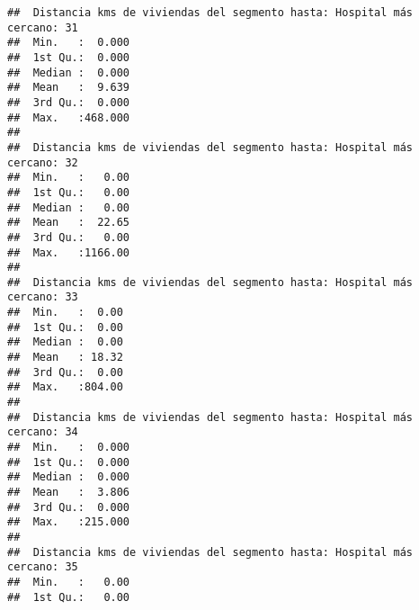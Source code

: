 \documentclass[11pt,]{article}
\begin{document}
\begin{verbatim}
##  Distancia kms de viviendas del segmento hasta: Hospital más cercano: 31
##  Min.   :  0.000                                                        
##  1st Qu.:  0.000                                                        
##  Median :  0.000                                                        
##  Mean   :  9.639                                                        
##  3rd Qu.:  0.000                                                        
##  Max.   :468.000                                                        
##                                                                         
##  Distancia kms de viviendas del segmento hasta: Hospital más cercano: 32
##  Min.   :   0.00                                                        
##  1st Qu.:   0.00                                                        
##  Median :   0.00                                                        
##  Mean   :  22.65                                                        
##  3rd Qu.:   0.00                                                        
##  Max.   :1166.00                                                        
##                                                                         
##  Distancia kms de viviendas del segmento hasta: Hospital más cercano: 33
##  Min.   :  0.00                                                         
##  1st Qu.:  0.00                                                         
##  Median :  0.00                                                         
##  Mean   : 18.32                                                         
##  3rd Qu.:  0.00                                                         
##  Max.   :804.00                                                         
##                                                                         
##  Distancia kms de viviendas del segmento hasta: Hospital más cercano: 34
##  Min.   :  0.000                                                        
##  1st Qu.:  0.000                                                        
##  Median :  0.000                                                        
##  Mean   :  3.806                                                        
##  3rd Qu.:  0.000                                                        
##  Max.   :215.000                                                        
##                                                                         
##  Distancia kms de viviendas del segmento hasta: Hospital más cercano: 35
##  Min.   :   0.00                                                        
##  1st Qu.:   0.00                                                        

\end{verbatim}
\end{document}
